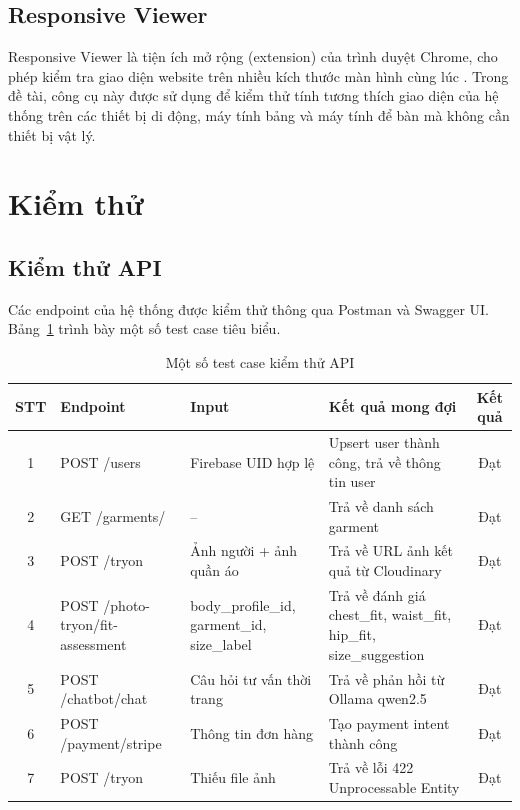 \subsection{Responsive Viewer}
Responsive Viewer là tiện ích mở rộng (extension) của trình duyệt 
Chrome, cho phép kiểm tra giao diện website trên nhiều kích thước 
màn hình cùng lúc \cite{responsive_viewer}. Trong đề tài, công cụ 
này được sử dụng để kiểm thử tính tương thích giao diện của hệ 
thống trên các thiết bị di động, máy tính bảng và máy tính để bàn 
mà không cần thiết bị vật lý.

\section{Kiểm thử}

\subsection{Kiểm thử API}

Các endpoint của hệ thống được kiểm thử thông qua Postman và 
Swagger UI. Bảng~\ref{tab:api_test} trình bày một số test case 
tiêu biểu.

\begin{table}[H]
\centering
\caption{Một số test case kiểm thử API}
\label{tab:api_test}
\begin{tabular}{|c|p{3cm}|p{3cm}|p{3cm}|c|}
\hline
\textbf{STT} & \textbf{Endpoint} & \textbf{Input} & 
\textbf{Kết quả mong đợi} & \textbf{Kết quả} \\
\hline
1 & POST /users & Firebase UID hợp lệ & 
Upsert user thành công, trả về thông tin user & Đạt \\
\hline
2 & GET /garments/ & -- & 
Trả về danh sách garment & Đạt \\
\hline
3 & POST /tryon & Ảnh người + ảnh quần áo & 
Trả về URL ảnh kết quả từ Cloudinary & Đạt \\
\hline
4 & POST /photo-tryon/fit-assessment & 
body\_profile\_id, garment\_id, size\_label & 
Trả về đánh giá chest\_fit, waist\_fit, hip\_fit, 
size\_suggestion & Đạt \\
\hline
5 & POST /chatbot/chat & Câu hỏi tư vấn thời trang & 
Trả về phản hồi từ Ollama qwen2.5 & Đạt \\
\hline
6 & POST /payment/stripe & Thông tin đơn hàng & 
Tạo payment intent thành công & Đạt \\
\hline
7 & POST /tryon & Thiếu file ảnh & 
Trả về lỗi 422 Unprocessable Entity & Đạt \\
\hline
\end{tabular}
\end{table}

